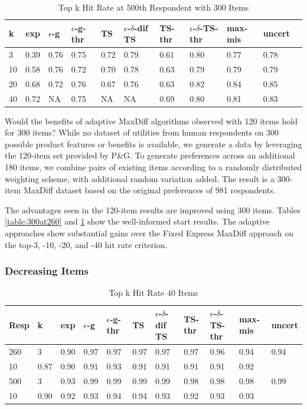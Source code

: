 \documentclass[nonblindrev]{informs3}
\newcommand{\fixedexpressS}{\textbf{exp}}
\newcommand{\egreedyS}{$\epsilon$-\textbf{g}}
\newcommand{\egreedythresS}{$\epsilon$-\textbf{g-thr}}
\newcommand{\misminS}{\textbf{max-mis}}
\newcommand{\tsS}{\textbf{TS} }
\newcommand{\edtsS}{$\epsilon$-$\delta$-\textbf{dif TS} }
\newcommand{\tsthresS}{\textbf{TS-thr} }
\newcommand{\edtsthresS}{$\epsilon$-$\delta$-\textbf{TS-thr} }
\newcommand{\uncertS}{\textbf{uncert} }
\begin{document}
\begin{table}
\caption{Top k Hit Rate at 500th Respondent with 300 Items}
\begin{center}
\begin{tabular}{lllllllllll}
\hline   k &  \fixedexpressS & \egreedyS&\egreedythresS&\tsS&\edtsS&\tsthresS&\edtsthresS& \misminS& \uncertS  \\ \hline  
3 & 0.39 &  0.76 & 0.75 & 0.72 & 0.79 & 0.61 &  0.80 &  0.77 &0.78 \\
10 &  0.58 &   0.76 & 0.72 & 0.70 & 0.78 & 0.63 & 0.79 & 0.79 &   0.79\\
20 & 0.68 & 0.72 & 0.76 & 0.67 & 0.76 &  0.63 & 0.82 & 0.84 &    0.85 \\ 
40 & 0.72 &   NA & 0.75 & NA & NA & 0.69 & 0.80 &0.81 & 0.83 \end{tabular}
\end{center}
\label{table:300at500}
\end{table}
Would the benefits of adaptive MaxDiff algorithms observed with 120 items hold for 300 items? While no dataset of utilities from human respondents on 300 possible product features or benefits is available, we generate a data by leveraging the 120-item set provided by P\&G. To generate preferences across an additional 180 items, we combine pairs of existing items according to a randomly distributed weighting scheme, with additional random variation added. The result is a 300-item MaxDiff dataset based on the original preferences of 981 respondents.

The advantages seen in the 120-item results are improved using 300 items. Tables \ref{table:300at260} and \ref{table:300at500} show the well-informed start results. The adaptive approaches show substantial gains over the Fixed Express MaxDiff approach on the top-3, -10, -20, and -40 hit rate criterion.

\subsubsection{Decreasing Items}

\begin{table}
\caption{Top k Hit Rate 40 Items}
\begin{center}
\begin{tabular}{lllllllllll}
\hline   Resp & k &  \fixedexpressS & \egreedyS&\egreedythresS&\tsS&\edtsS&\tsthresS&\edtsthresS& \misminS& \uncertS  \\
\hline 
260 & 3 & 0.90 & 0.97 &  0.97 &  0.97 & 0.97 & 0.97 &  0.96 & 0.94 &  0.94 \\  10 & 0.87 & 0.90 & 0.91 &  0.93 & 0.91 & 0.91 & 0.91 & 0.91 &  0.92  \\ 
500 & 3 & 0.93 & 0.99 & 0.99 & 0.99 & 0.99 & 0.98 & 0.98 & 0.98 &  0.99 \\  10 & 0.90 &   0.92 &  0.93  & 0.94 & 0.94 & 0.93 &    0.92 & 0.93 &  0.93 \end{tabular}
\end{center}
\label{table:40at260and500}
\end{table}
\end{document}
